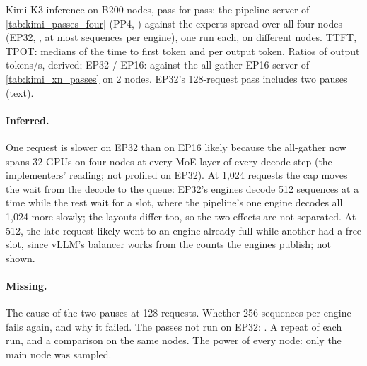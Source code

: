 \begin{table}[h]
  \caption{Kimi K3 inference on \TriKxnFourNodes{} B200 nodes, pass for pass: the pipeline server of \cref{tab:kimi_passes_four} (PP4, \TriKimiFourLayout) against the experts spread over all four nodes (EP32, \TriKxnFourLayout, at most \TriKxnFourMaxSeqs{} sequences per engine), one run each, on different nodes. TTFT, TPOT: medians of the time to first token and per output token. Ratios of output tokens/s, derived; EP32 / EP16: against the all-gather EP16 server of \cref{tab:kimi_xn_passes} on 2 nodes. EP32's 128-request pass includes two pauses (text).}
  \label{tab:kimi_xn_four_passes}
  \centering\scriptsize
  \begin{adjustbox}{max width=\linewidth}
  \end{adjustbox}
\end{table}

\paragraph{Inferred.} One request is slower on EP32 than on EP16 likely because the all-gather now spans 32 GPUs on four nodes at every MoE layer of every decode step (the implementers' reading; not profiled on EP32). At 1,024 requests the cap moves the wait from the decode to the queue: EP32's engines decode 512 sequences at a time while the rest wait for a slot, where the pipeline's one engine decodes all 1,024 more slowly; the layouts differ too, so the two effects are not separated. At 512, the late request likely went to an engine already full while another had a free slot, since vLLM's balancer works from the counts the engines publish; not shown.

\paragraph{Missing.} The cause of the two pauses at 128 requests. Whether 256 sequences per engine fails again, and why it failed. The passes not run on EP32: \TriKxnFourNotRun. A repeat of each run, and a comparison on the same nodes. The power of every node: only the main node was sampled.

